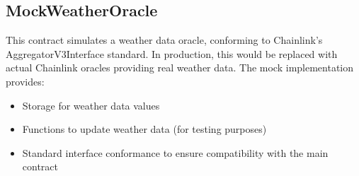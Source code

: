 \documentclass[11pt,a4paper]{article}
\begin{document}
	\subsection{MockWeatherOracle}\label{subsec:analysis-mock-weather-oracle}
	This contract simulates a weather data oracle, conforming to Chainlink's AggregatorV3Interface standard.
    In production, this would be replaced with actual Chainlink oracles providing real weather data.
    The mock implementation provides:

	\begin{itemize}
	    \item Storage for weather data values
	    \item Functions to update weather data (for testing purposes)
	    \item Standard interface conformance to ensure compatibility with the main contract
	\end{itemize}
\end{document}

